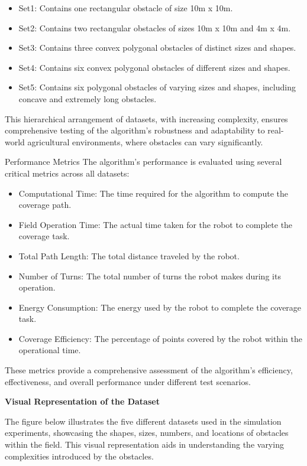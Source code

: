 \begin{itemize}
    \item Set1: Contains one rectangular obstacle of size 10m x 10m.
    \item Set2: Contains two rectangular obstacles of sizes 10m x 10m and 4m x 4m.
    \item Set3: Contains three convex polygonal obstacles of distinct sizes and shapes.
    \item Set4: Contains six convex polygonal obstacles of different sizes and shapes.
    \item Set5: Contains six polygonal obstacles of varying sizes and shapes, including concave and extremely long obstacles.
\end{itemize}
This hierarchical arrangement of datasets, with increasing complexity, ensures comprehensive testing of the algorithm's robustness and adaptability to real-world agricultural environments, where obstacles can vary significantly.

\vspace*{6mm}  

Performance Metrics
The algorithm's performance is evaluated using several critical metrics across all datasets:

\begin{itemize}
    \item Computational Time: The time required for the algorithm to compute the coverage path.
    \item Field Operation Time: The actual time taken for the robot to complete the coverage task.
    \item Total Path Length: The total distance traveled by the robot.
    \item Number of Turns: The total number of turns the robot makes during its operation.
    \item Energy Consumption: The energy used by the robot to complete the coverage task.
    \item Coverage Efficiency: The percentage of points covered by the robot within the operational time.
\end{itemize}
These metrics provide a comprehensive assessment of the algorithm's efficiency, effectiveness, and overall performance under different test scenarios.


\vspace*{6mm}  

\textbf{Visual Representation of the Dataset}

The figure below illustrates the five different datasets used in the simulation experiments, showcasing the shapes, sizes, numbers, and locations of obstacles within the field. This visual representation aids in understanding the varying complexities introduced by the obstacles.

